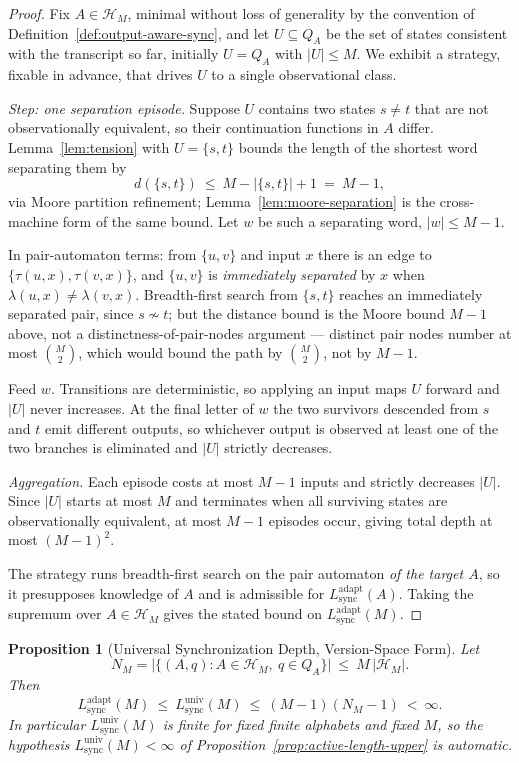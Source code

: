 \documentclass[12pt]{article}
\newtheorem{proposition}[theorem]{Proposition}
\theoremstyle{definition}
\newcommand{\Lsync}{L_{\mathrm{sync}}^{\mathrm{adapt}}}
\newcommand{\Lsyncu}{L_{\mathrm{sync}}^{\mathrm{univ}}}
\begin{document}
\begin{proof}
Fix $A\in\mathcal H_M$, minimal without loss of generality by the convention of
Definition~\ref{def:output-aware-sync}, and let $U\subseteq Q_A$ be the set of
states consistent with the transcript so far, initially $U=Q_A$ with
$|U|\le M$.  We exhibit a strategy, fixable in advance, that drives $U$ to a
single observational class.

\emph{Step: one separation episode.}  Suppose $U$ contains two states $s\ne t$
that are not observationally equivalent, so their continuation functions in
$A$ differ.  Lemma~\ref{lem:tension} with $U=\{s,t\}$ bounds the length of
the shortest word separating them by
\[
d(\{s,t\})\ \le\ M-|\{s,t\}|+1\ =\ M-1,
\]
via Moore partition refinement; Lemma~\ref{lem:moore-separation} is the
cross-machine form of the same bound.  Let $w$ be such a separating word,
$|w|\le M-1$.

In pair-automaton terms: from $\{u,v\}$ and input $x$ there is an edge to
$\{\tau(u,x),\tau(v,x)\}$, and $\{u,v\}$ is \emph{immediately separated} by
$x$ when $\lambda(u,x)\ne\lambda(v,x)$.  Breadth-first search from $\{s,t\}$
reaches an immediately separated pair, since $s\not\sim t$; but the distance
bound is the Moore bound $M-1$ above, not a distinctness-of-pair-nodes
argument --- distinct pair nodes number at most $\binom{M}{2}$, which would
bound the path by $\binom{M}{2}$, not by $M-1$.

Feed $w$.  Transitions are deterministic, so applying an input maps $U$ forward
and $|U|$ never increases.  At the final letter of $w$ the two survivors
descended from $s$ and $t$ emit different outputs, so whichever output is
observed at least one of the two branches is eliminated and $|U|$ strictly
decreases.

\emph{Aggregation.}  Each episode costs at most $M-1$ inputs and strictly
decreases $|U|$.  Since $|U|$ starts at most $M$ and terminates when all
surviving states are observationally equivalent, at most $M-1$ episodes occur,
giving total depth at most $(M-1)^2$.

The strategy runs breadth-first search on the pair automaton \emph{of the
target $A$}, so it presupposes knowledge of $A$ and is admissible for
$\Lsync(A)$.  Taking the supremum over $A\in\mathcal H_M$ gives the stated
bound on $\Lsync(M)$.
\end{proof}

\begin{proposition}[Universal Synchronization Depth, Version-Space Form]
\label{prop:lsyncu-version-space}
Let
\[
N_M=\bigl|\{(A,q):A\in\mathcal H_M,\ q\in Q_A\}\bigr|\ \le\ M\,|\mathcal H_M| .
\]
Then
\[
\Lsync(M)\ \le\ \Lsyncu(M)\ \le\ (M-1)(N_M-1)\ <\ \infty .
\]
In particular $\Lsyncu(M)$ is finite for fixed finite alphabets and fixed $M$,
so the hypothesis $\Lsyncu(M)<\infty$ of
Proposition~\ref{prop:active-length-upper} is automatic.
\end{proposition}
\end{document}
